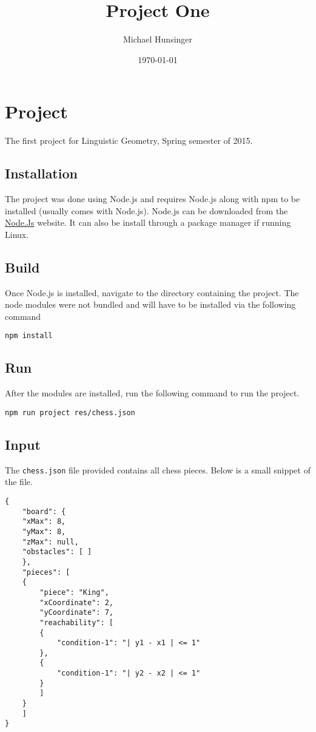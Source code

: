 \documentclass[a4paper]{article}
\author{Michael Hunsinger}
\date{\today}
\title{Project One}
\begin{document}
\maketitle
\tableofcontents


\section*{Project}
\label{sec-1}
The first project for Linguistic Geometry, Spring semester of 2015.

\subsection*{Installation}
\label{sec-1-1}
The project was done using Node.js and requires Node.js along with npm to be
installed (usually comes with Node.js). Node.js can be downloaded from the
\href{https://nodejs.org}{Node.Js} website. It can also be install through a package manager if running
Linux.

\subsection*{Build}
\label{sec-1-2}
Once Node.js is installed, navigate to the directory containing the
project. The node modules were not bundled and will have to be installed via
the following command

\begin{verbatim}
npm install
\end{verbatim}

\subsection*{Run}
\label{sec-1-3}
After the modules are installed, run the following command to run the
project.

\begin{verbatim}
npm run project res/chess.json
\end{verbatim}

\subsection*{Input}
\label{sec-1-4}
The \verb~chess.json~ file provided contains all chess pieces. Below is a small
snippet of the file.

\begin{verbatim}
{
    "board": {
	"xMax": 8,
	"yMax": 8,
	"zMax": null,
	"obstacles": [ ]
    },
    "pieces": [
	{
	    "piece": "King",
	    "xCoordinate": 2,
	    "yCoordinate": 7,
	    "reachability": [
		{
		    "condition-1": "| y1 - x1 | <= 1"
		},
		{
		    "condition-1": "| y2 - x2 | <= 1"
		}
	    ]
	}
    ]
}
\end{verbatim}
\end{document}
